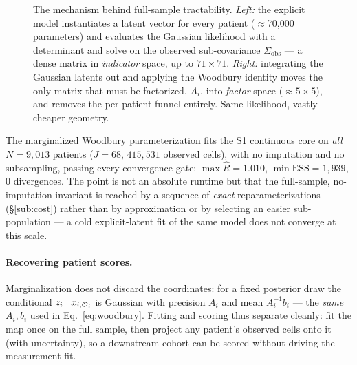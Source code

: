 \begin{figure}[h]\centering
\woodburydiagram
\caption{The mechanism behind full-sample tractability. \emph{Left:} the explicit model instantiates a latent
vector for every patient ($\approx$70{,}000 parameters) and evaluates the Gaussian likelihood with a
determinant and solve on the observed sub-covariance $\Sigma_{\mathrm{obs}}$ --- a dense matrix in
\emph{indicator} space, up to $71\times 71$. \emph{Right:} integrating the Gaussian latents out and applying
the Woodbury identity moves the only matrix that must be factorized, $A_i$, into \emph{factor} space
($\approx 5\times 5$), and removes the per-patient funnel entirely. Same likelihood, vastly cheaper geometry.}
\label{fig:woodbury}
\end{figure}

\begin{keyresult}
The marginalized Woodbury parameterization fits the S1 continuous core on \emph{all} $N=9{,}013$ patients
($J=68$, $415{,}531$ observed cells), with no imputation and no subsampling, passing every convergence gate:
$\max\widehat{R}=1.010$, $\min\mathrm{ESS}=1{,}939$, $0$ divergences. The point is not an absolute runtime but
that the full-sample, no-imputation invariant is reached by a sequence of \emph{exact} reparameterizations
(\S\ref{sub:cost}) rather than by approximation or by selecting an easier sub-population --- a cold
explicit-latent fit of the same model does not converge at this scale.
\end{keyresult}

\paragraph{Recovering patient scores.} Marginalization does not discard the coordinates: for a fixed posterior
draw the conditional $z_i\mid x_{i,\mathcal{O}_i}$ is Gaussian with precision $A_i$ and mean $A_i^{-1}b_i$ --- the
\emph{same} $A_i,b_i$ used in Eq.~\eqref{eq:woodbury}. Fitting and scoring thus separate cleanly: fit the map
once on the full sample, then project any patient's observed cells onto it (with uncertainty), so a downstream
cohort can be scored without driving the measurement fit.

